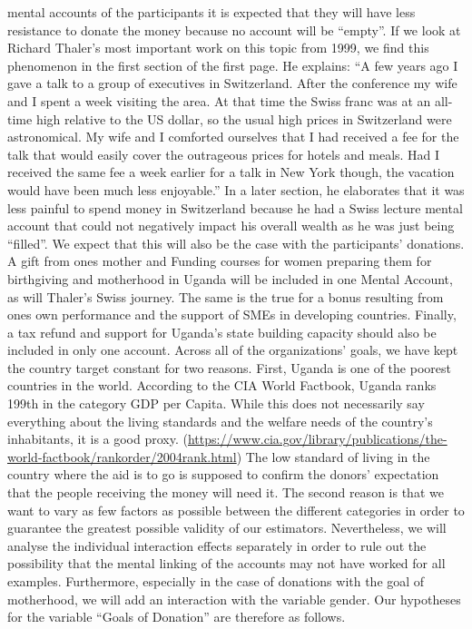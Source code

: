 \documentclass[
  12pt,
]{article}
\begin{document}
mental accounts of the participants it is expected that they will have
less resistance to donate the money because no account will be
``empty''. If we look at Richard Thaler's most important work on this
topic from 1999, we find this phenomenon in the first section of the
first page. He explains: ``A few years ago I gave a talk to a group of
executives in Switzerland. After the conference my wife and I spent a
week visiting the area. At that time the Swiss franc was at an all-time
high relative to the US dollar, so the usual high prices in Switzerland
were astronomical. My wife and I comforted ourselves that I had received
a fee for the talk that would easily cover the outrageous prices for
hotels and meals. Had I received the same fee a week earlier for a talk
in New York though, the vacation would have been much less enjoyable.''
In a later section, he elaborates that it was less painful to spend
money in Switzerland because he had a Swiss lecture mental account that
could not negatively impact his overall wealth as he was just being
``filled''. We expect that this will also be the case with the
participants' donations. A gift from ones mother and Funding courses for
women preparing them for birthgiving and motherhood in Uganda will be
included in one Mental Account, as will Thaler's Swiss journey. The same
is the true for a bonus resulting from ones own performance and the
support of SMEs in developing countries. Finally, a tax refund and
support for Uganda's state building capacity should also be included in
only one account. Across all of the organizations' goals, we have kept
the country target constant for two reasons. First, Uganda is one of the
poorest countries in the world. According to the CIA World Factbook,
Uganda ranks 199th in the category GDP per Capita. While this does not
necessarily say everything about the living standards and the welfare
needs of the country's inhabitants, it is a good proxy.
(\url{https://www.cia.gov/library/publications/the-world-factbook/rankorder/2004rank.html})
The low standard of living in the country where the aid is to go is
supposed to confirm the donors' expectation that the people receiving
the money will need it. The second reason is that we want to vary as few
factors as possible between the different categories in order to
guarantee the greatest possible validity of our estimators.
Nevertheless, we will analyse the individual interaction effects
separately in order to rule out the possibility that the mental linking
of the accounts may not have worked for all examples. Furthermore,
especially in the case of donations with the goal of motherhood, we will
add an interaction with the variable gender. Our hypotheses for the
variable ``Goals of Donation'' are therefore as follows.
\end{document}
